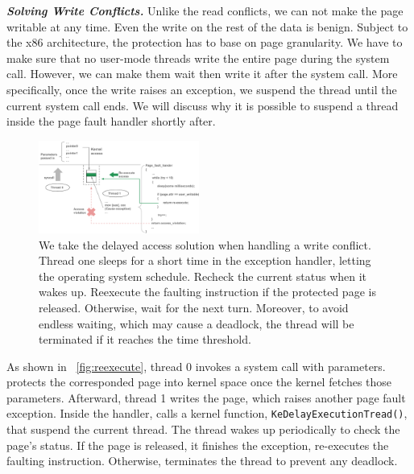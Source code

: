 \textbf{\textit{Solving Write Conflicts.}} Unlike the read conflicts, we can not make the page writable at any time. Even the write on the rest of the data is benign. Subject to the x86 architecture, the protection has to base on page granularity. We have to make sure that no user-mode threads write the entire page during the system call. However, we can make them wait then write it after the system call. More specifically, once the write raises an exception, we suspend the thread until the current system call ends. We will discuss why it is possible to suspend a thread inside the page fault handler shortly after.


\begin{figure}[th]
  \includegraphics[width=0.47\textwidth]{figures/reexecute}
  \centering
  \caption{We take the delayed access solution when handling a write conflict. Thread one sleeps for a short time in the exception handler, letting the operating system schedule. Recheck the current status when it wakes up. Reexecute the faulting instruction if the protected page is released. Otherwise, wait for the next turn. Moreover, to avoid endless waiting, which may cause a deadlock, the thread will be terminated if it reaches the time threshold.}
  \label{fig:reexecute}
\end{figure}


As shown in ~\autoref{fig:reexecute}, thread 0 invokes a system call with parameters.  \name protects the corresponded page into kernel space once the kernel fetches those parameters. Afterward, thread 1 writes the page, which raises another page fault exception. Inside the handler, \name calls a kernel function, \texttt{KeDelayExecutionTread()}, that suspend the current thread. The thread wakes up periodically to check the page's status. If the page is released, it finishes the exception, re-executes the faulting instruction. Otherwise, \name terminates the thread to prevent any deadlock.





